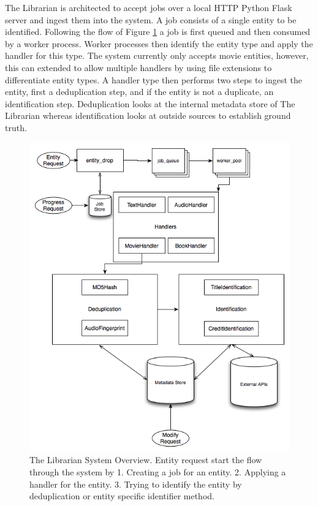 \documentclass[paper=a4, fontsize=11pt]{scrartcl} %
\numberwithin{equation}{section} %
\numberwithin{figure}{section} %
\numberwithin{table}{section} %
\begin{document}
The Librarian is architected to accept jobs over a local HTTP Python Flask server and ingest them into the system. A job consists of a single entity to be identified. Following the flow of Figure \ref{fig:system-overview} a job is first queued and then consumed by a worker process. Worker processes then identify the entity type and apply the handler for this type. The system currently only accepts movie entities, however, this can extended to allow multiple handlers by using file extensions to differentiate entity types. A handler type then performs two steps to ingest the entity, first a deduplication step, and if the entity is not a duplicate, an identification step. Deduplication looks at the internal metadata store of The Librarian whereas identification looks at outside sources to establish ground truth. \\


\begin{figure}[H]
\center\includegraphics[scale=0.75]{system-overview.png}
\caption{The Librarian System Overview. Entity request start the flow through the system by 1. Creating a job for an entity. 2. Applying a handler for the entity. 3. Trying to identify the entity by deduplication or entity specific identifier method.}
\label{fig:system-overview}
\end{figure}
\end{document}
